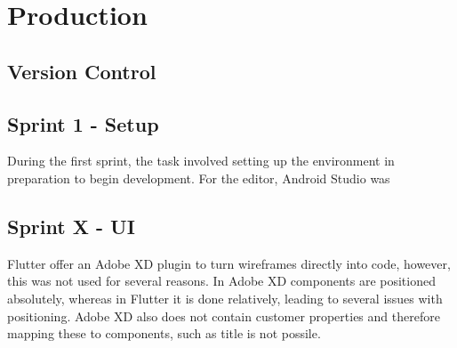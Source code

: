 \documentclass[12pt]{article}
\begin{document}
	\section{Production}
	\subsection{Version Control}
	
	\subsection{Sprint 1 - Setup}
	During the first sprint, the task involved setting up the environment in preparation to begin development. For the editor, Android Studio was 
	
	\subsection{Sprint X - UI}
	Flutter offer an Adobe XD plugin to turn wireframes directly into code, however, this was not used for several reasons. In Adobe XD components are positioned absolutely, whereas in Flutter it is done relatively, leading to several issues with positioning. Adobe XD also does not contain customer properties and therefore mapping these to components, such as title is not possile.
	

	
\end{document}

